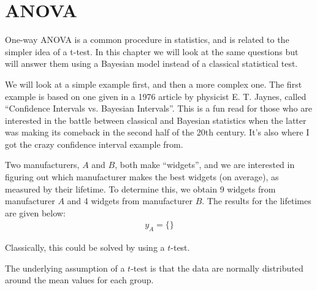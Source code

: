 \chapter{ANOVA}
One-way ANOVA is a common procedure in statistics, and is related to the
simpler idea of a t-test. In this chapter we will look at the same questions
but will answer them using a Bayesian model instead of a classical statistical
test.

We will look at a simple example first, and then a more complex one.
The first example is based on one given in a 1976 article by physicist E. T. Jaynes,
called ``Confidence Intervals vs. Bayesian Intervals''. This is a fun read for
those who are interested in the battle between classical and Bayesian statistics
when the latter was making its comeback in the second half of the 20th century.
It's also where I got the crazy confidence interval example from.

Two manufacturers, $A$ and $B$, both make ``widgets'', and we are interested
in figuring out which manufacturer makes the best widgets (on average), as
measured by their lifetime. To determine this, we obtain 9 widgets from
manufacturer $A$ and 4 widgets from manufacturer $B$. The results for the
lifetimes are given below:
\begin{eqnarray}
y_A = \{ \}
\end{eqnarray}

Classically, this could be solved by using a $t$-test.

The underlying assumption of a $t$-test is that the data are normally
distributed around the mean values for each group.
